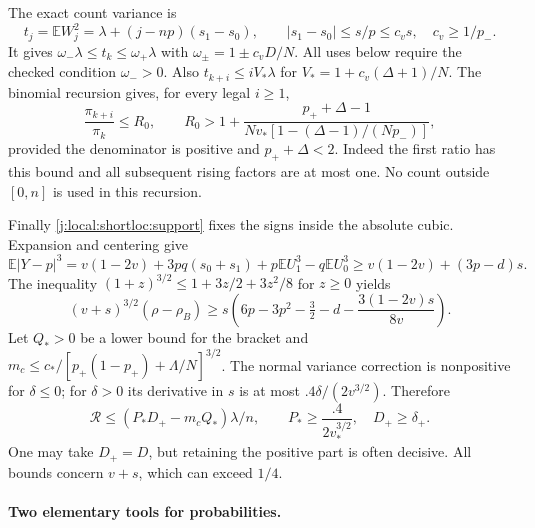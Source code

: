 The exact count variance is
\begin{equation}\label{j:local:shortloc:variance}
 t_j=\mathbb E W_j^2=\lambda+(j-np)(s_1-s_0),\qquad
 |s_1-s_0|\le s/p\le c_v s,\quad c_v\ge1/p_-.
\end{equation}
It gives $\omega_-\lambda\le t_k\le\omega_+\lambda$ with
$\omega_\pm=1\pm c_vD/N$. All uses below require the checked condition
$\omega_->0$. Also
$t_{k+i}\le iV_*\lambda$ for $V_*=1+c_v(\Delta+1)/N$.
The binomial recursion gives, for every legal $i\ge1$,
\begin{equation}\label{j:local:shortloc:ratio}
 \frac{\pi_{k+i}}{\pi_k}\le R_0,
 \qquad R_0>1+\frac{p_++\Delta-1}
 {Nv_*[1-(\Delta-1)/(Np_-)]},
\end{equation}
provided the denominator is positive and $p_++\Delta<2$.
Indeed the first ratio has this bound and all subsequent rising factors
are at most one. No count outside $[0,n]$ is used in this recursion.

Finally \eqref{j:local:shortloc:support} fixes the signs inside the absolute cubic.
Expansion and centering give
\[
 \mathbb E|Y-p|^3=v(1-2v)+3pq(s_0+s_1)
                   +p\mathbb E U_1^3-q\mathbb E U_0^3
 \ge v(1-2v)+(3p-d)s.
\]
The inequality $(1+z)^{3/2}\le1+3z/2+3z^2/8$ for $z\ge0$ yields
\begin{equation}\label{j:local:cubic-bound}
 (v+s)^{3/2}(\rho-\rho_B)\ge s
     \left(6p-3p^2-\tfrac32-d-\frac{3(1-2v)s}{8v}\right).
\end{equation}
Let $Q_*>0$ be a lower bound for the bracket and
$m_c\le c_*/[p_+(1-p_+)+\Lambda/N]^{3/2}$.
The normal variance correction is nonpositive for $\delta\le0$;
for $\delta>0$ its derivative in $s$ is at most $.4\delta/(2v^{3/2})$.
Therefore
\begin{equation}\label{j:local:shortloc:repair}
 \mathcal R\le(P_*D_+-m_cQ_*)\lambda/n,
 \qquad P_*\ge\frac{.4}{2v_*^{3/2}},\quad D_+\ge\delta_+.
\end{equation}
One may take $D_+=D$, but retaining the positive part is often decisive.
All bounds concern $v+s$, which can exceed $1/4$.

\paragraph{Two elementary tools for probabilities.}

